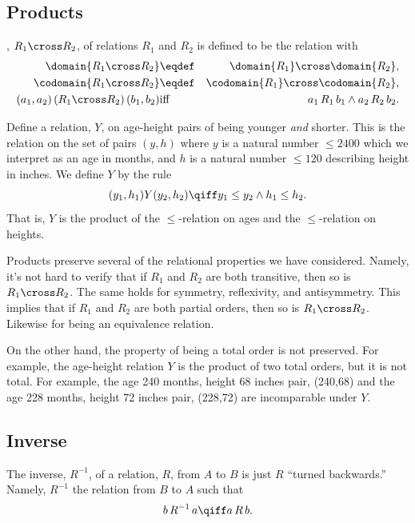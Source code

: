 \subsection{Products}
, $R_1 \cross R_2$, of relations
$R_1$ and $R_2$ is defined to be the relation with
\begin{eqnarray*}
\domain{R_1 \cross R_2} &\eqdef& \domain{R_1} \cross \domain{R_2},\\
\codomain{R_1 \cross R_2} &\eqdef& \codomain{R_1} \cross \codomain{R_2},\\
(a_1,a_2)\, (R_1 \cross R_2)\, (b_1,b_2) &\text{iff}& a_1\, R_1\, b_1
\land a_2\, R_2\, b_2.
\end{eqnarray*}

\begin{example}
Define a relation, $Y$, on age-height pairs of being younger \emph{and}
shorter.  This is the relation on the set of pairs $(y,h)$ where $y$ is a
natural number $\le 2400$ which we interpret as an age in months, and $h$
is a natural number $\le 120$ describing height in inches.  We define $Y$
by the rule
\[
(y_1,h_1) Y (y_2,h_2) \qiff y_1 \le y_2 \land h_1 \le h_2.
\]
That is, $Y$ is the product of the $\le$-relation on ages and the
$\le$-relation on heights.
\end{example}

Products preserve several of the relational properties we have considered.
Namely, it's not hard to verify that if $R_1$ and $R_2$ are both
transitive, then so is $R_1 \cross R_2$.  The same holds for symmetry,
reflexivity, and antisymmetry.  This implies that if $R_1$ and $R_2$ are
both partial orders, then so is $R_1 \cross R_2$.  Likewise for being an
equivalence relation.

On the other hand, the property of being a total order is not preserved.
For example, the age-height relation $Y$ is the product of two total
orders, but it is not total.  For example, the age 240 months, height 68
inches pair, (240,68) and the age 228 months, height 72 inches pair,
(228,72) are incomparable under $Y$.

\subsection{Inverse}

The inverse, $R^{-1}$, of a relation, $R$, from $A$ to $B$ is just $R$
``turned backwards.''  Namely, $R^{-1}$ the relation from $B$ to $A$ such that
\[
b\, R^{-1}\, a \qiff a\, R\, b.
\]

